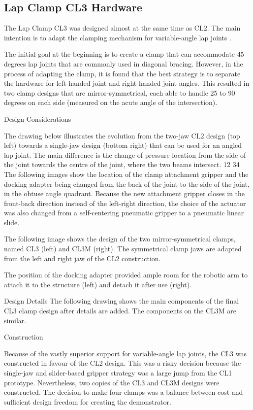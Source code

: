 \subsection{Lap Clamp CL3 Hardware}
\label{subsection:exploration-2-lap-clamp-cl3-hardware}

The Lap Clamp CL3 was designed almost at the same time as CL2. The main intention is to adapt the clamping mechanism for variable-angle lap joints . 

The initial goal at the beginning is to create a clamp that can accommodate 45 degrees lap joints that are commonly used in diagonal bracing. However, in the process of adapting the clamp, it is found that the best strategy is to separate the hardware for left-handed joint and right-handed joint angles. This resulted in two clamp designs that are mirror-symmetrical, each able to handle 25 to 90 degrees on each side (measured on the acute angle of the intersection). 

Design Considerations

The drawing below illustrates the evolution from the two-jaw CL2 design (top left) towards a single-jaw design (bottom right) that can be used for an angled lap joint. The main difference is the change of pressure location from the side of the joint towards the centre of the joint, where the two beams intersect.
12
34
The following images show the location of the clamp attachment gripper and the docking adapter being changed from the back of the joint to the side of the joint, in the obtuse angle quadrant. Because the new attachment gripper closes in the front-back direction instead of the left-right direction, the choice of the actuator was also changed from a self-centering pneumatic gripper to a pneumatic linear slide.


The following image shows the design of the two mirror-symmetrical clamps, named CL3 (left) and CL3M (right). The symmetrical clamp jaws are adapted from the left and right jaw of the CL2 construction.

The position of the docking adapter provided ample room for the robotic arm to attach it to the structure (left) and detach it after use (right). 

Design Details
The following drawing shows the main components of the final CL3 clamp design after details are added. The components on the CL3M are similar.


Construction

Because of the vastly superior support for variable-angle lap joints, the CL3 was constructed in favour of the CL2 design. This was a risky decision because the single-jaw and slider-based gripper strategy was a large jump from the CL1 prototype. Nevertheless, two copies of the CL3 and CL3M designs were constructed. The decision to make four clamps was a balance between cost and sufficient design freedom for creating the demonstrator.

